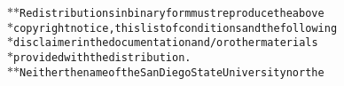 {{\begin{tabbing}
{\texttt{$\ast$\hspace{30pt}$\ast$\hspace{6pt}Redistributions\hspace{6pt}in\hspace{6pt}binary\hspace{6pt}form\hspace{6pt}must\hspace{6pt}reproduce\hspace{6pt}the\hspace{6pt}above}}\\
{\texttt{$\ast$\hspace{42pt}copyright\hspace{6pt}notice,\hspace{6pt}this\hspace{6pt}list\hspace{6pt}of\hspace{6pt}conditions\hspace{6pt}and\hspace{6pt}the\hspace{6pt}following}}\\
{\texttt{$\ast$\hspace{42pt}disclaimer\hspace{6pt}in\hspace{6pt}the\hspace{6pt}documentation\hspace{6pt}and/or\hspace{6pt}other\hspace{6pt}materials}}\\
{\texttt{$\ast$\hspace{42pt}provided\hspace{6pt}with\hspace{6pt}the\hspace{6pt}distribution.}}\\
{\texttt{$\ast$\hspace{30pt}$\ast$\hspace{6pt}Neither\hspace{6pt}the\hspace{6pt}name\hspace{6pt}of\hspace{6pt}the\hspace{6pt}San\hspace{6pt}Diego\hspace{6pt}State\hspace{6pt}University\hspace{6pt}nor\hspace{6pt}the}}\\

\end{tabbing}}}
